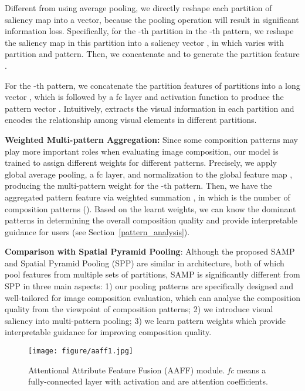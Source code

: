 \documentclass{bmvc2k}
\begin{document}
Different from  using average pooling,  we directly reshape each partition of saliency map into a vector, because the pooling operation will result in significant information loss.
Specifically, for the -th partition in the -th pattern, we reshape the saliency map in this partition into a saliency vector , in which  varies with partition and pattern. Then, we concatenate  and  to generate the partition feature . 

For the -th pattern, we concatenate the partition features of  partitions into a long vector , which is followed by a fc layer and  activation function to produce the pattern vector .  \textcolor[rgb]{0,0,0}{Intuitively,  extracts the visual information in each partition and   encodes the relationship among visual elements in different partitions.}

\noindent\textbf{Weighted Multi-pattern Aggregation:} 
Since some composition patterns may play more important roles when evaluating image composition, our model is trained to assign different weights for different patterns. Precisely, we apply global average pooling, a fc layer, and  normalization to the global feature map , producing the multi-pattern weight  for the -th pattern. Then, we have the aggregated pattern feature via weighted summation , in which  is the number of composition patterns (). Based on the learnt weights, we can know the dominant patterns in determining the overall composition quality and provide interpretable guidance for users (see Section~\ref{pattern_analysis}).

\noindent\textbf{Comparison with Spatial Pyramid Pooling}: Although the proposed SAMP and Spatial Pyramid Pooling (SPP) \cite{He2015SpatialPP} are similar in architecture, both of which pool features from multiple sets of partitions, SAMP is significantly different from SPP in three main aspects: 1) our pooling patterns are specifically designed and well-tailored for image composition evaluation, which can analyse the composition quality from the viewpoint of composition patterns; 2) we introduce visual saliency into multi-pattern pooling; 3) we learn pattern weights which provide interpretable guidance for improving composition quality.


\begin{wrapfigure}{R}{0.6\linewidth}
  \vspace{-8mm}
  \begin{center}
    \texttt{[image: figure/aaff1.jpg]}
  \end{center}
  \vspace{-5mm}
  \caption{Attentional Attribute Feature Fusion (AAFF) module. \emph{fc} means a fully-connected layer with  activation and  are attention coefficients.}
  \label{fig:aaff}
\end{wrapfigure}
\end{document}
